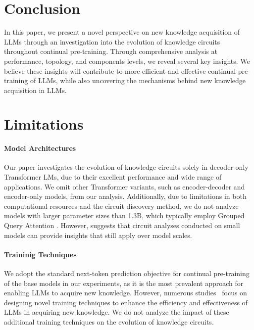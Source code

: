 \section{Conclusion}

In this paper, we present a novel perspective on new knowledge acquisition of LLMs through an investigation into the evolution of knowledge circuits throughout continual pre-training.
Through comprehensive analysis at performance, topology, and components levels, we reveal several key insights.
We believe these insights will contribute to more efficient and effective continual pre-training of LLMs, while also uncovering the mechanisms behind new knowledge acquisition in LLMs.

\section*{Limitations}
\paragraph{Model Architectures}
Our paper investigates the evolution of knowledge circuits solely in decoder-only Transformer LMs, due to their excellent performance and wide range of applications.
We omit other Transformer variants, such as encoder-decoder and encoder-only models, from our analysis.
Additionally, due to limitations in both computational resources and the circuit discovery method, we do not analyze models with larger parameter sizes than 1.3B, which typically employ Grouped Query Attention \citep{GQA}.
However, \citet{circuits_are_consistent} suggests that circuit analyses conducted on small models can provide insights that still apply over model scales.

\paragraph{Traininig Techniques}
We adopt the standard next-token prediction objective for continual pre-training of the base models in our experiments, as it is the most prevalent approach for enabling LLMs to acquire new knowledge.
However, numerous studies~\citep{pit,sft_injecting} focus on designing novel training techniques to enhance the efficiency and effectiveness of LLMs in acquiring new knowledge. 
We do not analyze the impact of these additional training techniques on the evolution of knowledge circuits.